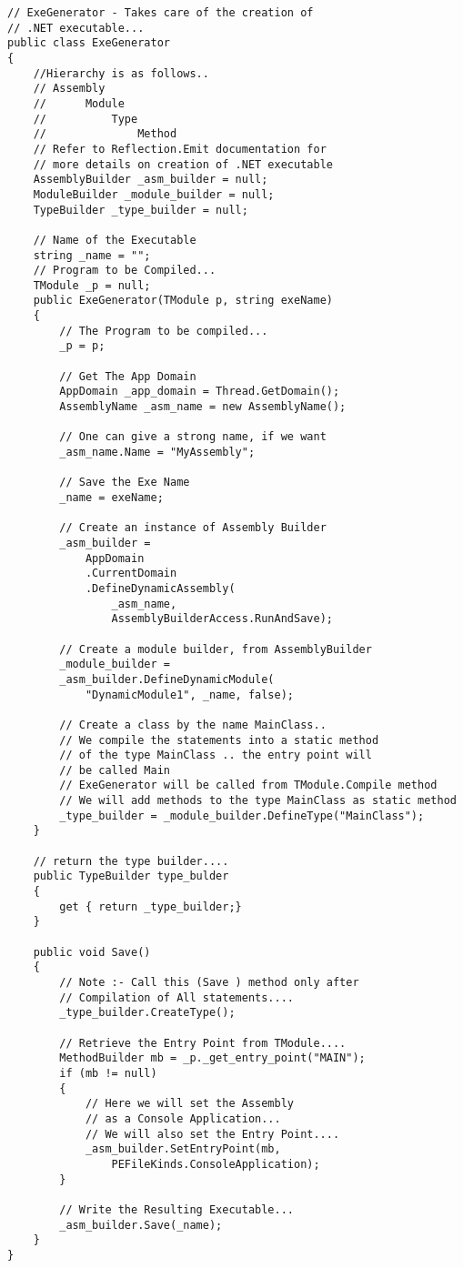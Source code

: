 \begin{lstlisting}
// ExeGenerator - Takes care of the creation of
// .NET executable...
public class ExeGenerator
{
	//Hierarchy is as follows..
	// Assembly
	// 		Module
	// 			Type
	// 				Method
	// Refer to Reflection.Emit documentation for
	// more details on creation of .NET executable
	AssemblyBuilder _asm_builder = null;
	ModuleBuilder _module_builder = null;
	TypeBuilder _type_builder = null;

	// Name of the Executable
	string _name = "";
	// Program to be Compiled...
	TModule _p = null;
	public ExeGenerator(TModule p, string exeName)
	{
		// The Program to be compiled...
		_p = p;
		
		// Get The App Domain
		AppDomain _app_domain = Thread.GetDomain();
		AssemblyName _asm_name = new AssemblyName();
		
		// One can give a strong name, if we want
		_asm_name.Name = "MyAssembly";
		
		// Save the Exe Name
		_name = exeName;

		// Create an instance of Assembly Builder
		_asm_builder = 
			AppDomain
			.CurrentDomain
			.DefineDynamicAssembly(
				_asm_name,
				AssemblyBuilderAccess.RunAndSave);
		
		// Create a module builder, from AssemblyBuilder
		_module_builder = 
		_asm_builder.DefineDynamicModule(
			"DynamicModule1", _name, false);

		// Create a class by the name MainClass..
		// We compile the statements into a static method
		// of the type MainClass .. the entry point will
		// be called Main
		// ExeGenerator will be called from TModule.Compile method
		// We will add methods to the type MainClass as static method
		_type_builder = _module_builder.DefineType("MainClass");
	}
	
	// return the type builder....
	public TypeBuilder type_bulder
	{
		get { return _type_builder;}
	}
	
	public void Save()
	{
		// Note :- Call this (Save ) method only after
		// Compilation of All statements....
		_type_builder.CreateType();
		
		// Retrieve the Entry Point from TModule....
		MethodBuilder mb = _p._get_entry_point("MAIN");
		if (mb != null)
		{
			// Here we will set the Assembly 
			// as a Console Application...
			// We will also set the Entry Point....
			_asm_builder.SetEntryPoint(mb, 
				PEFileKinds.ConsoleApplication);
		}
		
		// Write the Resulting Executable...
		_asm_builder.Save(_name);
	}
}
\end{lstlisting}
